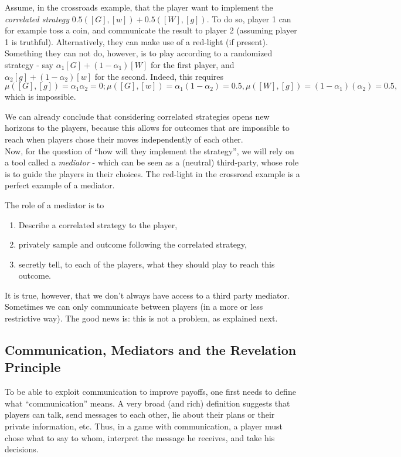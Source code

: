 \begin{example}
Assume, in the crossroads example, that the player want to implement the \emph{correlated strategy} $0.5([G], [w]) + 0.5 ([W], [g])$. To do so, player 1 can for example toss a coin, and communicate the result to player 2 (assuming player 1 is truthful).  Alternatively, they can make use of a red-light (if present).\\
Something they can not do, however, is to play according to a randomized strategy - say $\alpha_1[G] + (1-\alpha_1)[W]$ for the first player, and $\alpha_2[g] + (1-\alpha_2)[w]$ for the second.
Indeed, this requires
$$ \mu([G], [g]) = \alpha_1 \alpha_2 = 0; \mu([G], [w]) = \alpha_1 (1-\alpha_2) = 0.5, \mu([W], [g]) = (1-\alpha_1) (\alpha_2) = 0.5, $$
which is impossible.
\end{example}

We can already conclude that considering correlated strategies opens new horizons to the players, because this allows for outcomes that are impossible to reach when players chose their moves independently of each other.\\
Now, for the question of  ``how will they implement the strategy'', we will rely on a tool called a \emph{mediator} - which can be seen as a (neutral) third-party, whose role is to guide the players in their choices. The red-light in the crossroad example is a perfect example of a mediator. 

The role of a mediator is to    
\begin{enumerate}
\item Describe a correlated strategy to the player, 
\item privately sample and outcome following the correlated strategy,
\item secretly tell, to each of the players, what they should play to reach this outcome.
\end{enumerate}

It is true, however, that we don't always have access to a third party mediator. Sometimes we can only communicate between players (in a more or less restrictive way). The good news is: this is not a problem, as explained next.

\subsection{Communication, Mediators and the Revelation Principle}

To be able to exploit communication to improve payoffs, one first needs to define what ``communication'' means. A very broad (and rich) definition suggests that players can talk, send messages to each other, lie about their plans or their private information, etc. Thus, in a game with communication, a player must chose what to say to whom, interpret the message he receives, and take his decisions.

